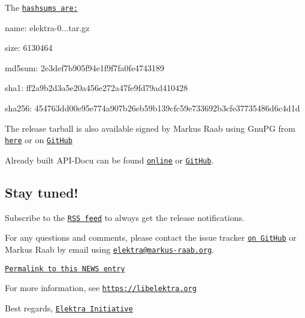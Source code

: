 The \href{https://github.com/ElektraInitiative/ftp/blob/master/releases/elektra-0.8.24.tar.gz.hashsum?raw=true}{\tt hashsums are\+:}


\begin{DoxyItemize}
\item name\+: elektra-\/0...\+tar.\+gz
\item size\+: 6130464
\item md5sum\+: 2e3def7b905f94e1f9f7fa0fe4743189
\item sha1\+: ff2a9b2d3a5e20a456e272a47fe9fd79ad410428
\item sha256\+: 454763dd00e95e774a907b26eb59b139cfc59e733692b3cfe37735486d6c4d1d
\end{DoxyItemize}

The release tarball is also available signed by Markus Raab using Gnu\+PG from \href{https://www.libelektra.org/ftp/elektra/releases/elektra-0.8.24.tar.gz.gpg}{\tt here} or on \href{https://github.com/ElektraInitiative/ftp/blob/master/releases//elektra-0.8.24.tar.gz.gpg?raw=true}{\tt Git\+Hub}

Already built A\+P\+I-\/\+Docu can be found \href{https://doc.libelektra.org/api/0.8.24/html/}{\tt online} or \href{https://github.com/ElektraInitiative/doc/tree/master/api/0.8.24}{\tt Git\+Hub}.

\subsection*{Stay tuned!}

Subscribe to the \href{https://www.libelektra.org/news/feed.rss}{\tt R\+SS feed} to always get the release notifications.

For any questions and comments, please contact the issue tracker \href{http://issues.libelektra.org}{\tt on Git\+Hub} or Markus Raab by email using \href{mailto:elektra@markus-raab.org}{\tt elektra@markus-\/raab.\+org}.

\href{https://www.libelektra.org/news/0.8.24-release}{\tt Permalink to this N\+E\+WS entry}

For more information, see \href{https://libelektra.org}{\tt https\+://libelektra.\+org}

Best regards, \href{https://www.libelektra.org/developers/authors}{\tt Elektra Initiative} 
